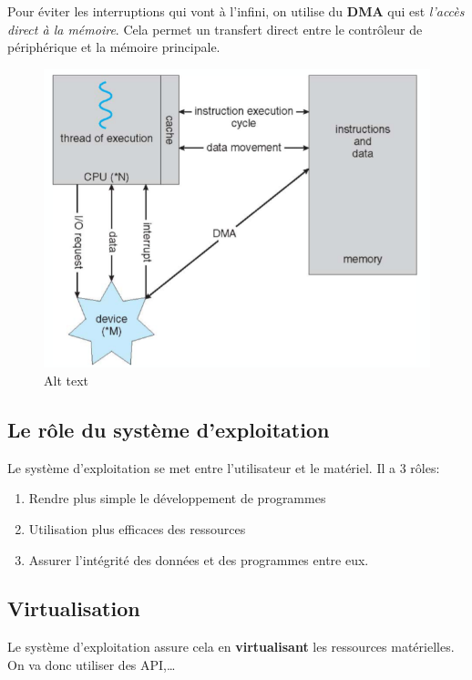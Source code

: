 Pour éviter les interruptions qui vont à l'infini, on utilise du
\textbf{DMA} qui est \emph{l'accès direct à la mémoire}. Cela permet un
transfert direct entre le contrôleur de périphérique et la mémoire
principale.

\begin{figure}
\centering
\includegraphics{image-1.png}
\caption{Alt text}
\end{figure}

\subsection{Le rôle du système
d'exploitation}\label{le-ruxf4le-du-systuxe8me-dexploitation}

Le système d'exploitation se met entre l'utilisateur et le matériel. Il
a 3 rôles:

\begin{enumerate}
\def\labelenumi{\arabic{enumi}.}
\tightlist
\item
  Rendre plus simple le développement de programmes
\item
  Utilisation plus efficaces des ressources
\item
  Assurer l'intégrité des données et des programmes entre eux.
\end{enumerate}

\subsection{Virtualisation}\label{virtualisation}

Le système d'exploitation assure cela en \textbf{virtualisant} les
ressources matérielles. On va donc utiliser des API,\ldots{}

